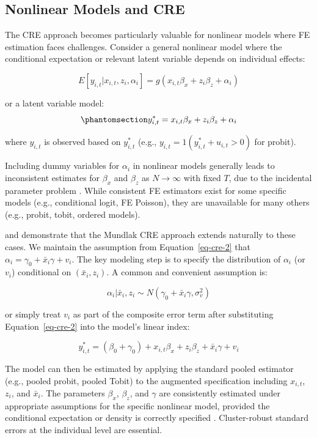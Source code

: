 \documentclass[bib]{statapress}
\begin{document}
\subsection{Nonlinear Models and CRE}\label{sec-2-2}

The CRE approach becomes particularly valuable for nonlinear models
where FE estimation faces challenges. Consider a general nonlinear model
where the conditional expectation or relevant latent variable depends on
individual effects:

\[E[y_{i,t} | x_{i,t}, z_i, \alpha_i] = g(x_{i,t}\beta_x + z_{i}\beta_z + \alpha_i)\]

or a latent variable model:
\begin{equation}\phantomsection\label{eq-nl-1}{y^*_{i,t} = x_{i,t}\beta_x + z_{i}\beta_z + \alpha_i
}\end{equation}

where \(y_{i,t}\) is observed based on \(y^*_{i,t}\) (e.g.,
\(y_{i,t} = 1(y^*_{i,t} + u_{i,t} > 0)\) for probit).

Including dummy variables for \(\alpha_i\) in nonlinear models generally
leads to inconsistent estimates for \(\beta_x\) and \(\beta_z\) as
\(N \rightarrow \infty\) with fixed \(T\), due to the incidental
parameter problem \citep{neyman1948consistent}. While consistent FE
estimators exist for some specific models (e.g., conditional logit, FE
Poisson), they are unavailable for many others (e.g., probit, tobit,
ordered models).

\citet[sec 10.7.3]{wooldridge2019} and \citet[chap
15.8]{wooldridge2010econometric} demonstrate that the Mundlak CRE
approach extends naturally to these cases. We maintain the assumption
from Equation~\ref{eq-cre-2} that
\(\alpha_i = \gamma_0 + \bar x_{i}\gamma + v_i\). The key modeling step
is to specify the distribution of \(\alpha_i\) (or \(v_i\)) conditional
on \((\bar x_i, z_i)\). A common and convenient assumption is:

\[\alpha_i | \bar x_i, z_i \sim N(\gamma_0 + \bar x_{i}\gamma, \sigma^2_v)\]

or simply treat \(v_i\) as part of the composite error term after
substituting Equation~\ref{eq-cre-2} into the model's linear index:

\[y^*_{i,t} = (\beta_0 + \gamma_0) + x_{i,t}\beta_x + z_{i}\beta_z + \bar x_{i}\gamma + v_i\]

The model can then be estimated by applying the standard pooled
estimator (e.g., pooled probit, pooled Tobit) to the augmented
specification including \(x_{i,t}\), \(z_i\), and \(\bar x_i\). The
parameters \(\beta_x\), \(\beta_z\), and \(\gamma\) are consistently
estimated under appropriate assumptions for the specific nonlinear
model, provided the conditional expectation or density is correctly
specified \citep{wooldridge2019}. Cluster-robust standard errors at the
individual level are essential.
\end{document}
